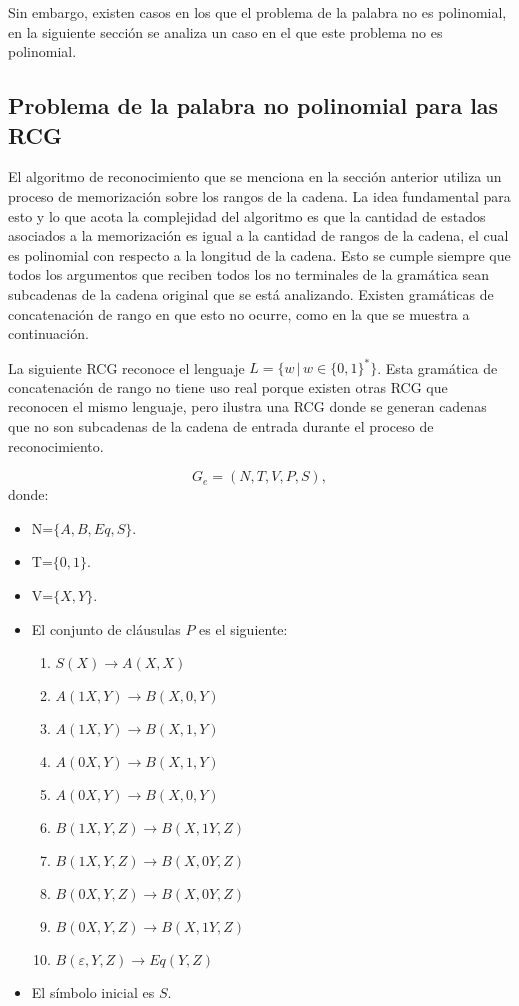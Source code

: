 Sin embargo, existen casos en los que el problema de la palabra no es polinomial, en la siguiente sección se analiza un caso en el que este problema no es polinomial.

\subsection{Problema de la palabra no polinomial para las RCG}

El algoritmo de reconocimiento que se menciona en la sección anterior utiliza un proceso de memorización sobre los rangos de la cadena.  La idea fundamental para esto y lo que acota la complejidad del algoritmo es que la cantidad de estados asociados a la memorización es igual a la cantidad de rangos de la cadena, el cual es polinomial con respecto a la longitud de la cadena. Esto se cumple siempre que todos los argumentos que reciben todos los no terminales de la gramática sean subcadenas de la cadena original que se está analizando. Existen gramáticas de concatenación de rango en que esto no ocurre, como en la que se muestra a continuación.

La siguiente RCG reconoce el lenguaje $L=\{w\,|\,w\in\{0,1\}^*\}$. Esta gramática de concatenación de rango no tiene uso real porque existen otras RCG que reconocen el mismo lenguaje, pero ilustra una RCG donde se generan cadenas que no son subcadenas de la cadena de entrada durante el proceso de reconocimiento.

\[
    G_e = (N, T, V, P, S),
\]
donde:

\begin{itemize}
    \item  N=$\{A,B,Eq,S\}$.
    \item T=$\{0,1\}$.
    \item V=$\{X,Y\}$.
    \item El conjunto de cláusulas $P$ es el siguiente:
          \begin{enumerate}
              \item $S(X)\to A(X,X)$
              \item $A(1X,Y)\to B(X,0,Y)$
              \item $A(1X,Y)\to B(X,1,Y)$
              \item $A(0X,Y)\to B(X,1,Y)$
              \item $A(0X,Y)\to B(X,0,Y)$
              \item $B(1X,Y,Z)\to B(X,1Y,Z)$
              \item $B(1X,Y,Z)\to B(X,0Y,Z)$
              \item $B(0X,Y,Z)\to B(X,0Y,Z)$
              \item $B(0X,Y,Z)\to B(X,1Y,Z)$
              \item $B(\varepsilon,Y,Z)\to Eq(Y,Z)$
          \end{enumerate}
          
    \item El símbolo inicial es $S$.
\end{itemize}

